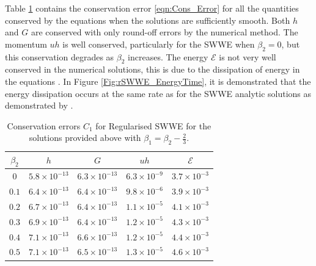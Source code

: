 \documentclass[10pt]{elsarticle}
\newcommand\T{\rule{0pt}{3ex }}       %
\begin{document}
Table \ref{tab:rSWWE_Con} contains the conservation error \eqref{eqn:Cons_Error} for all the quantities conserved by the equations when the solutions are sufficiently smooth. Both $h$ and $G$ are conserved with only round-off errors by the numerical method. The momentum $uh$ is well conserved, particularly for the SWWE when $\beta_2 = 0$, but this conservation degrades as $\beta_2$ increases. The energy $\mathcal{E}$ is not very well conserved in the numerical solutions, this is due to the dissipation of energy in the equations \cite{Pu-2018-1361}. In Figure \ref{Fig:rSWWE_EnergyTime}, it is demonstrated that the energy dissipation occurs at the same rate as for the SWWE analytic solutions as demonstrated by \citet{Pu-2018-1361}. 
%
\begin{table}
	\centering
	\begin{tabular}{ c | c | c | c | c }
		$\beta_2$ & $h$ & $G$ & $uh$ & $\mathcal{E}$  \\
		\hline
		\T $0$ &	$5.8 \times 10^{-13}$ & $6.3 \times 10^{-13}$  & $6.3 \times 10^{-9}$ &	 $3.7 \times 10^{-3}$ \\
		\T $0.1$ &	$6.4 \times 10^{-13}$ & $6.4 \times 10^{-13}$  & $9.8 \times 10^{-6}$ &	 $3.9 \times 10^{-3}$ \\
		\T $0.2$ &	$6.7 \times 10^{-13}$ & $6.4 \times 10^{-13}$  & $1.1\times 10^{-5}$ &	 $4.1 \times 10^{-3}$ \\
		\T $0.3$ &	$6.9 \times 10^{-13}$ & $6.4 \times 10^{-13}$  & $1.2\times 10^{-5}$ &	 $4.3 \times 10^{-3}$ \\
		\T $0.4$ &	$7.1 \times 10^{-13}$ & $6.6 \times 10^{-13}$  & $1.2\times 10^{-5}$ &	 $4.4 \times 10^{-3}$ \\
		\T $0.5$ &	$7.1 \times 10^{-13}$ & $6.5 \times 10^{-13}$  & $1.3\times 10^{-5}$ &	 $4.6 \times 10^{-3}$ \\
	\end{tabular}
	\caption{Conservation errors $C_1$ for Regularised SWWE for the solutions provided above with $\beta_1 = \beta_2 - \frac{2}{3}$.}
	\label{tab:rSWWE_Con}
\end{table}
%
\end{document}
